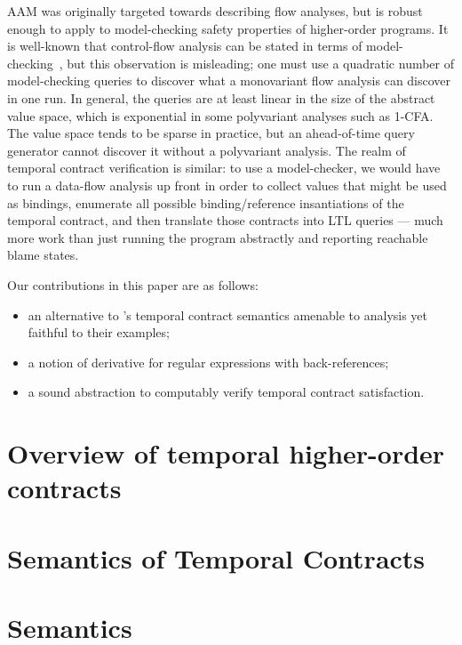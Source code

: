 AAM was originally targeted towards describing flow analyses, but is robust enough to apply to model-checking safety properties of higher-order programs.
%
It is well-known that control-flow analysis can be stated in terms of model-checking~\citep{ianjohnson:analysis-is-mc}, but this observation is misleading; one must use a quadratic number of model-checking queries to discover what a monovariant flow analysis can discover in one run.
%
In general, the queries are at least linear in the size of the abstract value space, which is exponential in some polyvariant analyses such as 1-CFA. %
%
The value space tends to be sparse in practice, but an ahead-of-time query generator cannot discover it without a polyvariant analysis.
%
The realm of temporal contract verification is similar: to use a model-checker, we would have to run a data-flow analysis up front in order to collect values that might be used as bindings, enumerate all possible binding/reference insantiations of the temporal contract, and then translate those contracts into LTL queries --- much more work than just running the program abstractly and reporting reachable blame states.
%

Our contributions in this paper are as follows:
\begin{itemize}
 \item{an alternative to \dfm's temporal contract semantics amenable to analysis yet faithful to their examples;}
 \item{a notion of derivative for regular expressions with back-references;}
 \item{a sound abstraction to computably verify temporal contract satisfaction.}
\end{itemize}

\section{Overview of temporal higher-order contracts}


\section{Semantics of Temporal Contracts} \label{sec:temporal-semantics}



\section{Semantics}\label{sec:technical}

